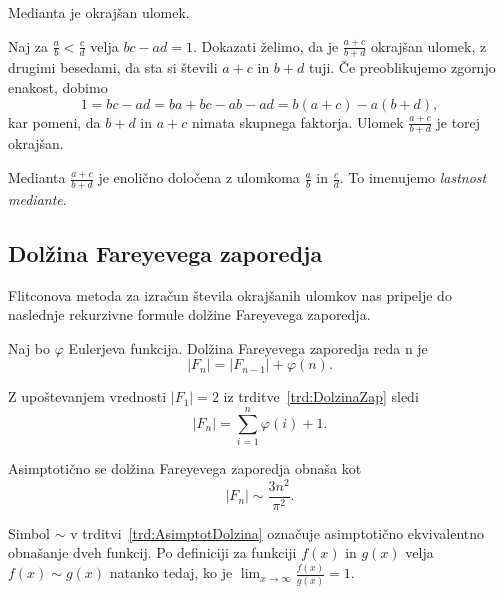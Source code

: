 \documentclass[mat1]{fmfdelo}
\begin{document}
\begin{lema}
\label{lema:MediantaOkrUlom}
Medianta je okrajšan ulomek.
\end{lema}

\begin{dokaz}
Naj za $\frac{a}{b} < \frac{c}{d}$ velja $bc - ad = 1$. Dokazati želimo, da je $\frac{a+c}{b+d}$ okrajšan ulomek, z drugimi besedami, da sta si števili $a+c$ in $b+d$ tuji. Če preoblikujemo zgornjo enakost, dobimo 
\[ 1 = bc - ad = ba + bc - ab - ad = b(a + c) - a(b + d), \]
kar pomeni, da $b+d$ in $a+c$ nimata skupnega faktorja. Ulomek $\frac{a+c}{b+d}$ je torej okrajšan.
\end{dokaz}

\begin{opomba}
Medianta $\frac{a+c}{b+d}$ je enolično določena z ulomkoma $\frac{a}{b}$ in $\frac{c}{d}$. To imenujemo \emph{lastnost mediante}.
\end{opomba}

%
\subsection{Dolžina Fareyevega zaporedja}

Flitconova metoda za izračun števila okrajšanih ulomkov nas pripelje do naslednje rekurzivne formule dolžine Fareyevega zaporedja.

\begin{trditev}
\label{trd:DolzinaZap}
Naj bo $\varphi$ Eulerjeva funkcija. Dolžina Fareyevega zaporedja reda n je
\[  |F_{n}| = |F_{n-1}| + \varphi(n). \]
\end{trditev}

\begin{opomba}
\label{op:AsimptotDolzina}
Z upoštevanjem vrednosti $|F_{1}| = 2$ iz trditve~\ref{trd:DolzinaZap} sledi \[  |F_{n}| = \sum_{i=1}^n \varphi(i) + 1. \]
\end{opomba}

\begin{trditev}
\label{trd:AsimptotDolzina}
Asimptotično se dolžina Fareyevega zaporedja obnaša kot
\[  |F_{n}|\sim\frac{3n^2}{\pi^2}. \]
\end{trditev}

\begin{opomba}
Simbol $\sim$ v trditvi~\ref{trd:AsimptotDolzina} označuje asimptotično ekvivalentno obnašanje dveh funkcij.
Po definiciji za funkciji $f(x)$ in $g(x)$ velja $f(x) \sim g(x)$ natanko tedaj, ko je $ \lim_{x \to \infty} \frac{f(x)}{g(x)} = 1$.
\end{opomba}
\end{document}
